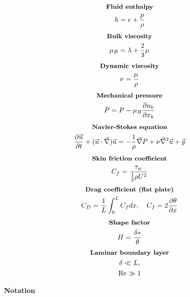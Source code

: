 \documentclass[10pt, a4paper]{article}
\newcommand{\derivative}[2]{\frac{\partial #1}{\partial #2}}
\begin{document}
\begin{multicols*}{2}
    \begin{gather*}
        \textbf{\small Fluid enthalpy} \\
        h = e + \frac{p}{\rho}
    \end{gather*}
    \begin{gather*}
        \textbf{\small Bulk viscosity} \\
        \mu_B = \lambda + \frac23 \mu
    \end{gather*}
    \begin{gather*}
        \textbf{\small Dynamic viscosity} \\
        \nu = \frac{\mu}{\rho}
    \end{gather*}
    \begin{gather*}
        \textbf{\small Mechanical pressure} \\
        \bar{P} = P - \mu_B\derivative{u_k}{x_k}
    \end{gather*}
    \begin{gather*}
        \textbf{\small Navier-Stokes equation} \\
        \derivative{ \vec{u}}{t} + (\vec{u}\cdot \vec{\nabla})\vec{u} = 
        -\frac{1}{\rho}\vec{\nabla}P + \nu \vec{\nabla}^2 \vec{u} + \vec{g}
    \end{gather*}
    \begin{gather*}
        \textbf{\small Skin friction coefficient} \\
        C_f = \frac{\tau_w}{\frac12 \rho U^2}
    \end{gather*}
    \begin{gather*}
        \textbf{\small Drag coefficient (flat plate)} \\
        C_D = \frac{1}{L}\int_0^L C_f dx, \quad C_f = 2\derivative{ \theta}{x}
    \end{gather*}
    \begin{gather*}
        \textbf{\small Shape factor} \\
        H = \frac{\delta *}{\theta}
    \end{gather*}
    \begin{gather*}
        \textbf{\small Laminar boundary layer} \\
        \delta \ll L, \\
        \text{Re} \gg 1
    \end{gather*}
\end{multicols*}
\begin{center}
    \Large
    \textbf{Notation}
    \vspace{0.5cm}
\end{center}
\end{document}
